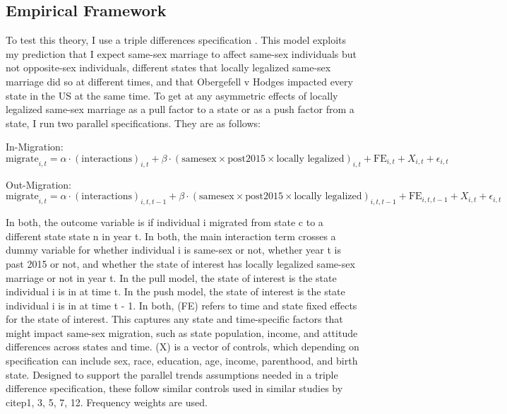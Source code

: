\documentclass[12pt,letterpaper]{article}
\begin{document}
\subsection{Empirical Framework}

To test this theory, I use a triple differences specification \citep{23, 24, 25}. This model exploits my prediction that I expect same-sex marriage to affect same-sex individuals but not opposite-sex individuals, different states that locally legalized same-sex marriage did so at different times, and that Obergefell v Hodges impacted every state in the US at the same time. To get at any asymmetric effects of locally legalized same-sex marriage as a pull factor to a state or as a push factor from a state, I run two parallel specifications. They are as follows:

In-Migration:
\begin{equation}
\text{migrate}_{i,t} = \alpha \cdot (\text{interactions})_{i,t} 
+ \beta \cdot (\text{samesex} \times \text{post2015} \times \text{locally legalized})_{i,t} 
+ \text{FE}_{i,t} + X_{i,t} + \epsilon_{i,t}
\end{equation}

Out-Migration:
\begin{equation}
\text{migrate}_{i,t} = 
\alpha \cdot (\text{interactions})_{i,t,t-1} + \beta \cdot (\text{samesex} \times \text{post2015} \times \text{locally legalized})_{i,t,t-1} + \text{FE}_{i,t,t-1} + X_{i,t} + \epsilon_{i,t}
\end{equation}

In both, the outcome variable is if individual i migrated from state c to a different state state n in year t. In both, the main interaction term crosses a dummy variable for whether individual i is same-sex or not, whether year t is past 2015 or not, and whether the state of interest has locally legalized same-sex marriage or not in year t. In the pull model, the state of interest is the state individual i is in at time t. In the push model, the state of interest is the state individual i is in at time t - 1. In both, (FE) refers to time and state fixed effects for the state of interest. This captures any state and time-specific factors that might impact same-sex migration, such as state population, income, and attitude differences across states and time. (X) is a vector of controls, which depending on specification can include sex, race, education, age, income, parenthood, and birth state. Designed to support the parallel trends assumptions needed in a triple difference specification, these follow similar controls used in similar studies by citep{1, 3, 5, 7, 12}. Frequency weights are used.
\end{document}
